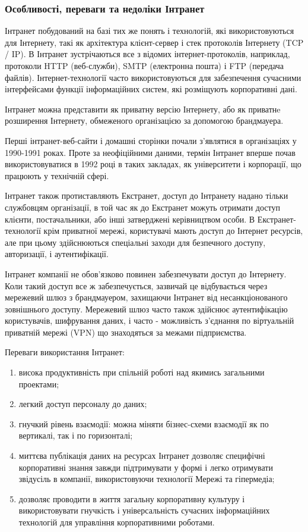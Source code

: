 \subsubsection{Особливості, переваги та недоліки Інтранет}
Інтранет побудований на базі тих же понять і технологій, які використовуються для Інтернету, такі як архітектура клієнт-сервер і стек протоколів Інтернету (TCP / IP). 
В Інтранет зустрічаються все з відомих інтернет-протоколів, наприклад, протоколи HTTP (веб-служби), SMTP (електронна пошта) і FTP (передача файлів). 
Інтернет-технології часто використовуються для забезпечення сучасними інтерфейсами функції інформаційних систем, які розміщують корпоративні дані.
\par Інтранет можна представити як приватну версію Інтернету, або як приватнe розширення Інтернету, обмеженого організацією за допомогою брандмауера. 
\par Перші інтранет-веб-сайти і домашні сторінки почали з'являтися в організаціях у 1990-1991 роках. 
Проте за неофіційними даними, термін Інтранет вперше почав використовуватися в 1992 році в таких закладах, як університети і корпорації, що працюють у технічній сфері.
\par Інтранет також протиставляють Екстранет, доступ до Інтранету надано тільки службовцям організації, в той час як до Екстранет можуть отримати доступ клієнти, постачальники, або інші затверджені керівництвом особи. 
В Екстранет-технології крім приватної мережі, користувачі мають доступ до Інтернет ресурсів, але при цьому здійснюються спеціальні заходи для безпечного доступу, авторизації, і аутентифікації.
\par Інтранет компанії не обов'язково повинен забезпечувати доступ до Інтернету. 
Коли такий доступ все ж забезпечується, зазвичай це відбувається через мережевий шлюз з брандмауером, захищаючи Інтранет від несанкціонованого зовнішнього доступу. 
Мережевий шлюз часто також здійснює аутентифікацію користувачів, шифрування даних, і часто - можливість з'єднання по віртуальній приватній мережі (VPN) що знаходяться за межами підприємства.

Переваги використання Інтранет:
\begin{enumerate}
\item висока продуктивність при спільній роботі над якимись загальними проектами;
\item легкий доступ персоналу до даних;
\item гнучкий рівень взаємодії: можна міняти бізнес-схеми взаємодії як по вертикалі, так і по горизонталі;
\item миттєва публікація даних на ресурсах Інтранет дозволяє специфічні корпоративні знання завжди підтримувати у формі і легко отримувати звідусіль в компанії, використовуючи технології Мережі та гіпермедіа;
\item дозволяє проводити в життя загальну корпоративну культуру і використовувати гнучкість і універсальність сучасних інформаційних технологій для управління корпоративними роботами.
\end{enumerate}


